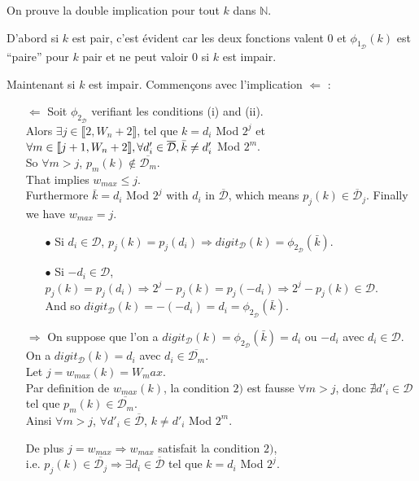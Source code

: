\documentclass[12pt, a4paper]{memoir}
\begin{document}
\begin{Preuve}
 On prouve la double implication pour tout $k$ dans $\mathbb{N}$.
 
 D'abord si $k$ est pair, c'est évident car les deux fonctions valent $0$ et $\phi_{1_\mathcal{D}}(k)$ est ``paire'' pour $k$ pair et ne peut valoir $0$ si $k$ est impair.
 
 Maintenant si $k$ est impair. Commençons avec l'implication $\Leftarrow$ :
 \begin{itemize}
  \item [$\Leftarrow$] Soit $\phi_{2_\mathcal{D}}$ verifiant les conditions (i) and (ii). \\
  Alors $\exists j \in \llbracket 2,W_n+2 \rrbracket$,
 tel que $k = d_i$ Mod $2^j$ et $\forall m \in \llbracket j+1,W_n+2 \rrbracket, \\
 \forall d'_i \in \overline{\mathcal{D}}, \bar{k} \neq d'_i$ Mod $2^m$. \\
 So $\forall m > j$, $p_m(k) \notin \overline{\mathcal{D}_m}$. \\
 That implies $w_{max} \leq j$. \\
 Furthermore $\bar{k} = d_i$ Mod $2^j$ with $d_i$ in $\overline{\mathcal{D}}$, which means $p_j(k) \in \overline{\mathcal{D}}_j$.
 Finally we have $w_{max} = j$.
  \begin{itemize}
   \item [$\bullet$] Si $d_i \in \mathcal{D}$,  $p_j(k)=p_j(d_i) \Rightarrow digit_{\mathcal{D}}(k) = \phi_{2_\mathcal{D}}(\bar{k})$.
   \item [$\bullet$] Si $-d_i \in \mathcal{D}$, $p_j(k)=p_j(d_i) \Rightarrow 2^j - p_j(k)=p_j(-d_i) \Rightarrow 2^j - p_j(k) \in \mathcal{D}$. \\
   And so $digit_{\mathcal{D}}(k) =-(-d_i)=d_i=\phi_{2_\mathcal{D}}(\bar{k})$.
  \end{itemize}
  \item [$\Rightarrow$] On suppose que l'on a $digit_{\mathcal{D}}(k) = \phi_{2_\mathcal{D}}(\bar{k}) = d_i$ ou $-d_i$ avec $d_i \in \mathcal{D}$. \\
  On a $digit_{\mathcal{D}}(k) = d_i$ avec $d_i \in \overline{\mathcal{D}_m}$. \\
  Let $j = w_{max}(k) = W_max$. \\
  Par definition de $w_{max}(k)$, la condition $2)$ est fausse $\forall m > j$, 
  donc $\nexists d'_i \in \mathcal{D}$ tel que $p_m(k) \in \overline{\mathcal{D}_m}$. \\
  Ainsi $\forall m > j$, $\forall d'_i \in \overline{\mathcal{D}}$, $k \neq d'_i$ Mod $2^m$.
  
  De plus $j=w_{max} \Rightarrow w_{max}$ satisfait la condition $2)$, \\
  i.e. $p_j(k) \in \overline{\mathcal{D}_j} \Rightarrow \exists d_i \in \overline{\mathcal{D}}$ tel que $k = d_i$ Mod $2^j$.
 \end{itemize}

\end{Preuve}
\end{document}

